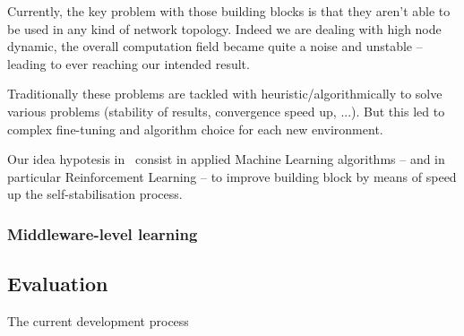 \documentclass[11pt]{article}
\begin{document}
Currently, the key problem with those building blocks is that they aren't able to be used in any kind of network topology. Indeed we are dealing with high node dynamic, the overall computation field became quite a noise and unstable -- leading to ever reaching our intended result.

Traditionally these problems are tackled with heuristic/algorithmically to solve various problems (stability of results, convergence speed up, ...). But this led to complex fine-tuning and algorithm choice for each new environment.

Our idea hypotesis in~\cite{research} consist in applied Machine Learning algorithms -- and in particular Reinforcement Learning -- to improve building block by means of speed up the self-stabilisation process.
\subsubsection{Middleware-level learning}
\subsection{Evaluation}\label{evaluation}
The current development process



\end{document}
